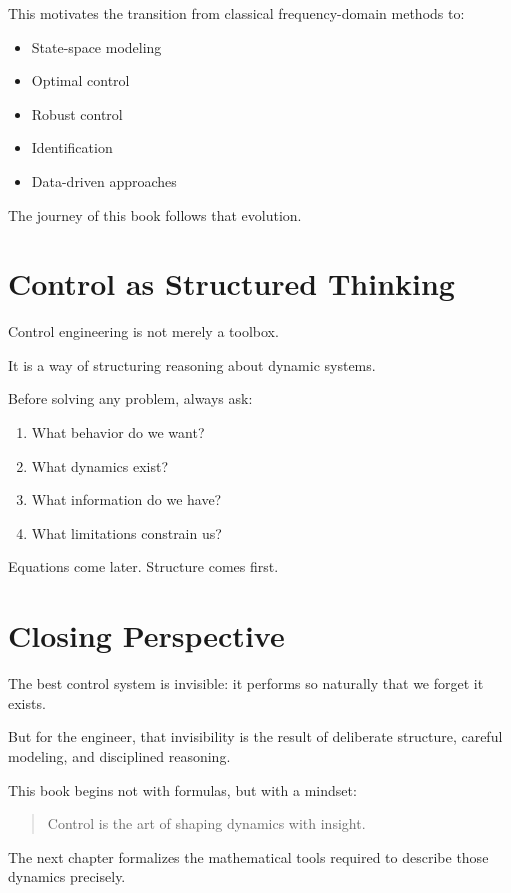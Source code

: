 This motivates the transition from classical frequency-domain methods to:

\begin{itemize}
	\item State-space modeling
	\item Optimal control
	\item Robust control
	\item Identification
	\item Data-driven approaches
\end{itemize}

The journey of this book follows that evolution.

\section{Control as Structured Thinking}

Control engineering is not merely a toolbox.

It is a way of structuring reasoning about dynamic systems.

Before solving any problem, always ask:

\begin{enumerate}
	\item What behavior do we want?
	\item What dynamics exist?
	\item What information do we have?
	\item What limitations constrain us?
\end{enumerate}

Equations come later.
Structure comes first.

\section{Closing Perspective}

The best control system is invisible:
it performs so naturally that we forget it exists.

But for the engineer,
that invisibility is the result of deliberate structure,
careful modeling,
and disciplined reasoning.

This book begins not with formulas,
but with a mindset:

\begin{quote}
	Control is the art of shaping dynamics with insight.
\end{quote}

The next chapter formalizes the mathematical tools required
to describe those dynamics precisely.
